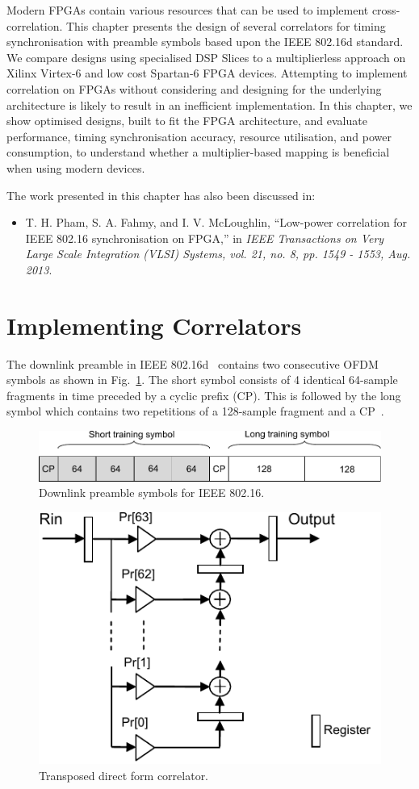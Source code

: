 Modern FPGAs contain various resources that can be used to implement cross-correlation.
This chapter presents the design of several correlators for timing synchronisation with preamble symbols based upon the IEEE 802.16d standard.
We compare designs using specialised DSP Slices to a multiplierless approach on Xilinx Virtex-6 and low cost Spartan-6 FPGA devices.
Attempting to implement correlation on FPGAs without considering and designing for the underlying architecture is likely to result in an inefficient implementation.
In this chapter, we show optimised designs, built to fit the FPGA architecture, and evaluate performance, timing synchronisation accuracy, resource utilisation, and power consumption, to understand whether a multiplier-based mapping is beneficial when using modern devices.

The work presented in this chapter has also been discussed in:
\begin{itemize}
\item  T. H. Pham, S. A. Fahmy, and I. V. McLoughlin, ``Low-power correlation for IEEE 802.16 synchronisation on FPGA,'' in \textit{IEEE Transactions on Very Large Scale Integration (VLSI) Systems, vol. 21, no. 8, pp. 1549 - 1553, Aug. 2013}.
\end{itemize}
\section{Implementing Correlators}

The downlink preamble in IEEE 802.16d~\cite{IEEE80216} contains two consecutive OFDM symbols as shown in Fig.~\ref{fig:pre}.
The short symbol consists of 4 identical 64-sample fragments in time preceded by a cyclic prefix (CP).
This is followed by the long symbol which contains two repetitions of a 128-sample fragment and a CP~\cite{IEEE80216}.

\begin{figure}
	\centerline{\includegraphics [width=0.7\columnwidth] {figures/Preamble.pdf} }
	\caption{Downlink preamble symbols for IEEE 802.16.}
	\label{fig:pre}
\end{figure}

\begin{figure}
	\centerline{\includegraphics [width=0.4\columnwidth] {figures/structure_correlator.pdf} }
	\caption{Transposed direct form correlator.}
	\label{fig:str_corr}
\end{figure}


